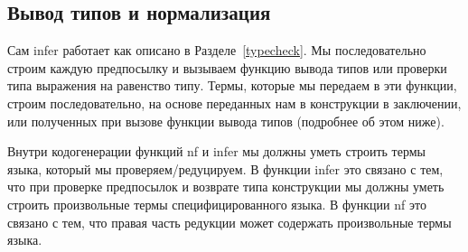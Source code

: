 \subsection{Вывод типов и нормализация}\label{nf_infer}
Сам infer работает как описано в Разделе~\ref{typecheck}. Мы последовательно строим каждую предпосылку и вызываем функцию вывода типов или проверки типа выражения на равенство типу. Термы, которые мы передаем в эти функции, строим последовательно, на основе переданных нам в конструкции в заключении, или полученных при вызове функции вывода типов (подробнее об этом ниже).

Внутри кодогенерации функций nf и infer мы должны уметь строить термы языка, который мы проверяем/редуцируем. В функции infer это связано с тем, что при проверке предпосылок и возврате типа конструкции мы должны уметь строить произвольные термы специфицированного языка. В функции nf это связано с тем, что правая часть редукции может содержать произвольные термы языка.



